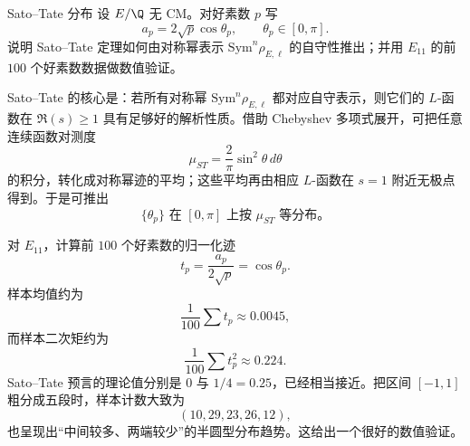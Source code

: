 \begin{problem}{Sato--Tate 分布 \hard}
设 $E/\Q$ 无 CM。对好素数 $p$ 写
\[
a_p=2\sqrt p\cos\theta_p,\qquad \theta_p\in[0,\pi].
\]
说明 Sato--Tate 定理如何由对称幂表示 $\mathrm{Sym}^n\rho_{E,\ell}$ 的自守性推出；并用 $E_{11}$ 的前 $100$ 个好素数数据做数值验证。
\end{problem}
\begin{solution}
Sato--Tate 的核心是：若所有对称幂 $\mathrm{Sym}^n\rho_{E,\ell}$ 都对应自守表示，则它们的 $L$-函数在 $\Re(s)\ge 1$ 具有足够好的解析性质。借助 Chebyshev 多项式展开，可把任意连续函数对测度
\[
\mu_{ST}=\frac{2}{\pi}\sin^2\theta\,d\theta
\]
的积分，转化成对称幂迹的平均；这些平均再由相应 $L$-函数在 $s=1$ 附近无极点得到。于是可推出
\[
\{\theta_p\}\text{ 在 }[0,\pi]\text{ 上按 }\mu_{ST}\text{ 等分布。}
\]

对 $E_{11}$，计算前 $100$ 个好素数的归一化迹
\[
t_p=\frac{a_p}{2\sqrt p}=\cos\theta_p.
\]
样本均值约为
\[
\frac1{100}\sum t_p\approx 0.0045,
\]
而样本二次矩约为
\[
\frac1{100}\sum t_p^2\approx 0.224.
\]
Sato--Tate 预言的理论值分别是 $0$ 与 $1/4=0.25$，已经相当接近。把区间 $[-1,1]$ 粗分成五段时，样本计数大致为
\[
(10,29,23,26,12),
\]
也呈现出“中间较多、两端较少”的半圆型分布趋势。这给出一个很好的数值验证。
\end{solution}
